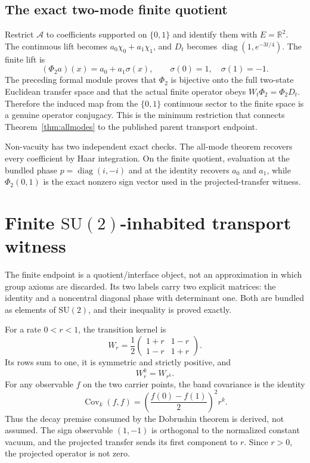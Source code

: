 \documentclass[11pt]{article}
\theoremstyle{definition}
\theoremstyle{remark}
\newcommand{\SU}{\mathrm{SU}(2)}
\begin{document}
\subsection{The exact two-mode finite quotient}

Restrict $\mathcal A$ to coefficients supported on $\{0,1\}$ and identify
them with $E=\mathbb R^2$.  The continuous lift becomes
$a_0\chi_0+a_1\chi_1$, and $D_t$ becomes
$\operatorname{diag}(1,e^{-3t/4})$.  The finite lift is
\[
  (\Phi_2a)(x)=a_0+a_1\sigma(x),
  \qquad \sigma(0)=1,\quad\sigma(1)=-1.
\]
The preceding formal module proves that $\Phi_2$ is bijective onto the full
two-state Euclidean transfer space and that the actual finite operator obeys
$W_t\Phi_2=\Phi_2D_t$.  Therefore the induced map from the $\{0,1\}$
continuous sector to the finite space is a genuine operator conjugacy.  This
is the minimum restriction that connects Theorem~\ref{thm:allmodes} to the
published parent transport endpoint.

Non-vacuity has two independent exact checks.  The all-mode theorem recovers
every coefficient by Haar integration.  On the finite quotient, evaluation
at the bundled phase $p=\operatorname{diag}(i,-i)$ and at the identity recovers
$a_0$ and $a_1$, while $\Phi_2(0,1)$ is the exact nonzero sign vector used in
the projected-transfer witness.

\section{Finite \texorpdfstring{$\SU$}{SU(2)}-inhabited transport witness}

The finite endpoint is a quotient/interface object, not an approximation in
which group axioms are discarded.  Its two labels carry two explicit matrices:
the identity and a noncentral diagonal phase with determinant one.  Both are
bundled as elements of $\SU$, and their inequality is proved exactly.

For a rate $0<r<1$, the transition kernel is
\[
  W_r=\frac12
  \begin{pmatrix}1+r&1-r\\1-r&1+r\end{pmatrix}.
\]
Its rows sum to one, it is symmetric and strictly positive, and
\[
  W_r^k=W_{r^k}.
\]
For any observable $f$ on the two carrier points, the band covariance is the
identity
\begin{equation}\label{eq:cov}
  \operatorname{Cov}_k(f,f)=
  \left(\frac{f(0)-f(1)}2\right)^2r^k.
\end{equation}
Thus the decay premise consumed by the Dobrushin theorem is derived, not
assumed.  The sign observable $(1,-1)$ is orthogonal to the normalized constant
vacuum, and the projected transfer sends its first component to $r$.  Since
$r>0$, the projected operator is not zero.
\end{document}
